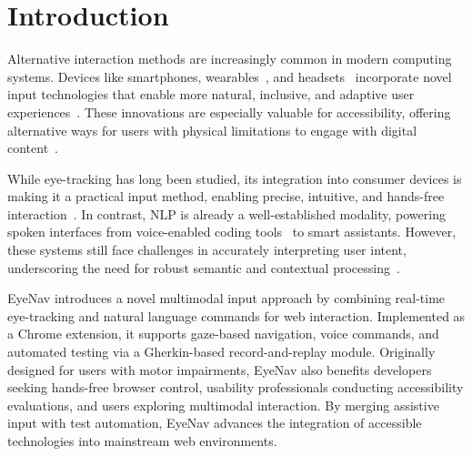 
\section{Introduction}

Alternative interaction methods are increasingly common in modern computing systems. Devices like smartphones, wearables~\cite{tobii_glasses_x}, and headsets~\cite{apple_vision_pro_2025,playstation_vr2_specs,vive_pro2_2025} incorporate novel input technologies that enable more natural, inclusive, and adaptive user experiences~\cite{dondi2023gazehci, fernandes2023eyevr}. These innovations are especially valuable for accessibility, offering alternative ways for users with physical limitations to engage with digital content~\cite{hsieh2024increasing}.

While eye-tracking has long been studied, its integration into consumer devices is making it a practical input method, enabling precise, intuitive, and hands-free interaction~\cite{huang2024visionpro}. In contrast, NLP is already a well-established modality, powering spoken interfaces from voice-enabled coding tools~\cite{serenade2025} to smart assistants. However, these systems still face challenges in accurately interpreting user intent, underscoring the need for robust semantic and contextual processing~\cite{mozafari2020chatbot, liu2024chatgpt}.

EyeNav introduces a novel multimodal input approach by combining real-time eye-tracking and natural language commands for web interaction. Implemented as a Chrome extension, it supports gaze-based navigation, voice commands, and automated testing via a Gherkin-based record-and-replay module. Originally designed for users with motor impairments, EyeNav also benefits developers seeking hands-free browser control, usability professionals conducting accessibility evaluations, and users exploring multimodal interaction. By merging assistive input with test automation, EyeNav advances the integration of accessible technologies into mainstream web environments.%